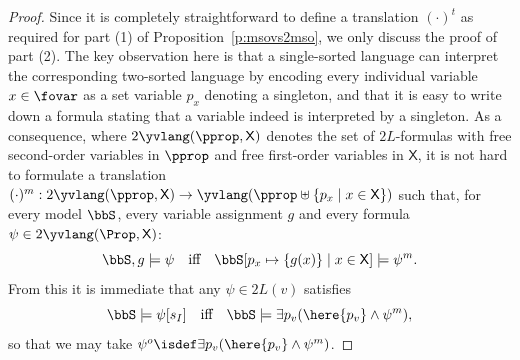 \begin{proof}
Since it is completely straightforward to define a translation $(\cdot)^{t}$ as 
required for part (1) of Proposition~\ref{p:msovs2mso}, we only discuss the proof 
of part (2). 
The key observation here is that a single-sorted language can interpret the 
corresponding two-sorted language by encoding every individual variable $x \in 
\fovar$ as a set variable $p_x$ denoting a singleton, and that it is easy to 
write down a formula stating that a variable indeed is interpreted by a 
singleton.
As a consequence, where $2\yvlang(\pprop,\mathsf{X})$ denotes the set of
$2L$-formulas with free second-order variables in $\pprop$ and free first-order
variables in $\mathsf{X}$, it is not hard to formulate a translation 
$(\cdot)^{m} : 2\yvlang(\pprop,\mathsf{X}) \to \yvlang(\pprop \uplus 
\{ p_{x} \mid x \in \mathsf{X} \})$
such that, for every model $\bbS$, every variable assignment $g$ and every
formula $\psi \in 2\yvlang(\Prop,\mathsf{X})$:
\[
\bbS,g \models \psi \quad\text{iff}\quad 
\bbS[p_{x} \mapsto \{g(x)\} \mid x \in \mathsf{X}] \models \psi^m.
\]
From this it is immediate that any $\psi \in 2L(v)$ satisfies
\[
\bbS \models \psi[s_{I}]
\quad\text{iff}\quad 
\bbS \models \exists p_{v} (\here{p_{v}} \land \psi^{m}),
\]
so that we may take $\psi^{o} \isdef \exists p_{v} (\here{p_{v}} \land 
\psi^{m})$.
\end{proof}

